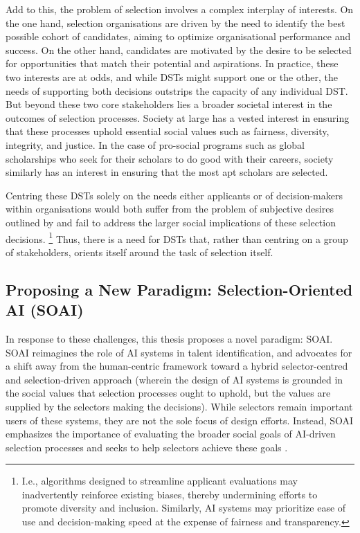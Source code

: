 Add to this, the problem of selection involves a complex interplay of interests. On the one hand, selection organisations are driven by the need to identify the best possible cohort of candidates, aiming to optimize organisational performance and success. On the other hand, candidates are motivated by the desire to be selected for opportunities that match their potential and aspirations. In practice, these two interests are at odds, and while DSTs might support one or the other, the needs of supporting both decisions outstrips the capacity of any individual DST. But beyond these two core stakeholders lies a broader societal interest in the outcomes of selection processes. Society at large has a vested interest in ensuring that these processes uphold essential social values such as fairness, diversity, integrity, and justice. In the case of pro-social programs such as global scholarships who seek for their scholars to do good with their careers, society similarly has an interest in ensuring that the most apt scholars are selected.

Centring these DSTs solely on the needs either applicants or of decision-makers within organisations would both suffer from the problem of subjective desires outlined by \textcite{Lipton} and fail to address the larger social implications of these selection decisions. \footnote{I.e., algorithms designed to streamline applicant evaluations may inadvertently reinforce existing biases, thereby undermining efforts to promote diversity and inclusion. Similarly, AI systems may prioritize ease of use and decision-making speed at the expense of fairness and transparency.} Thus, there is a need for DSTs that, rather than centring on a group of stakeholders, orients itself around the task of selection itself.

\subsection{Proposing a New Paradigm: Selection-Oriented AI (SOAI)}
In response to these challenges, this thesis proposes a novel paradigm: SOAI. SOAI reimagines the role of AI systems in talent identification, and advocates for a shift away from the human-centric framework toward a hybrid selector-centred and selection-driven approach (wherein the design of AI systems is grounded in the social values that selection processes ought to uphold, but the values are supplied by the selectors making the decisions). While selectors remain important users of these systems, they are not the sole focus of design efforts. Instead, SOAI emphasizes the importance of evaluating the broader social goals of AI-driven selection processes and seeks to help selectors achieve these goals \cite{batyavalue}.

